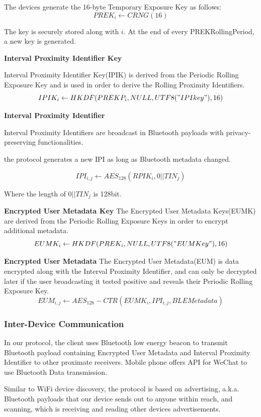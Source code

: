 \documentclass[11pt,en]{elegantpaper}
\begin{document}
The devices generate the 16-byte Temporary Exposure Key as follows: 
$$PREK_i\leftarrow CRNG(16)$$

The key is securely stored along with $i$. At the end of every PREKRollingPeriod, a new key is generated. 

\textbf{Interval Proximity Identifier Key}

Interval Proximity Identifier Key(IPIK) is derived from the Periodic Rolling Exposure Key and is used in
order to derive the Rolling Proximity Identifiers\cite{hirmer2020techniques}. 
$$IPIK_i\leftarrow HKDF(PREKP_i,NULL,UTF8("IPIkey"), 16)$$

\textbf{Interval Proximity Identifier}

Interval Proximity Identifiers are broadcast in Bluetooth payloads with privacy-preserving functionalities.

the protocol generates a new IPI as long as Bluetooth metadata changed.

$$IPI_{i,j}\leftarrow AES_{128}(RPIK_i,0||TIN_j)$$

Where the length of $0||TIN_j$ is 128bit.

\textbf{Encrypted User Metadata Key}
The Encrypted User Metadata Keys(EUMK) are derived from the Periodic Rolling Exposure Keys in order to encrypt additional metadata.
$$EUMK_i\leftarrow HKDF(PREK_i,NULL,UTF8("EUMKey"), 16)$$

\textbf{Encrypted User Metadata}
The Encrypted User Metadata(EUM) is data encrypted along with the Interval Proximity Identifier, and can only be decrypted later if the user broadcasting it tested positive and reveals their Periodic Rolling Exposure Key\cite{keselman2020homomorphic}. 
$$EUM_{i,j}\leftarrow AES_{128}-CTR(EUMK_i,IPI_{i,j},BLEMetadata)$$


\subsubsection{Inter-Device Communication}
In our protocol, the client uses Bluetooth low energy beacon to transmit Bluetooth payload containing Encrypted User Metadata and Interval Proximity Identifier to other proximate receivers. Mobile phone offers API for WeChat to use Bluetooth Data transmission.

Similar to WiFi device discovery, the protocol is based on advertising\cite{tang2020privacy}, a.k.a. Bluetooth payloads that our device sends out to anyone within reach, and scanning, which is receiving and reading other devices advertisements.
\end{document}
